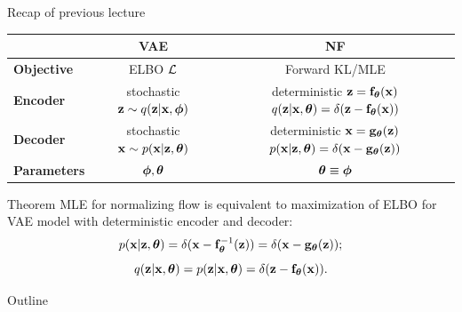 \begin{frame}{Recap of previous lecture}
	\begin{table}[]
		\begin{tabular}{l|c|c}
			& \textbf{VAE} & \textbf{NF} \\ \hline
			\textbf{Objective} & ELBO $\mathcal{L}$ & Forward KL/MLE \\ \hline
			\textbf{Encoder} & \shortstack{stochastic \\ $\mathbf{z} \sim q (\mathbf{z} | \mathbf{x}, \boldsymbol{\phi})$} &  \shortstack{\\ deterministic \\ $\mathbf{z} = \mathbf{f}_{\boldsymbol{\theta}}(\mathbf{x})$ \\ $q(\mathbf{z} | \mathbf{x}, \boldsymbol{\theta}) = \delta(\mathbf{z} - \mathbf{f}_{\boldsymbol{\theta}}(\mathbf{x}))$}  \\ \hline
			\textbf{Decoder} & \shortstack{stochastic \\ $\mathbf{x} \sim p (\mathbf{x} | \mathbf{z}, \boldsymbol{\theta})$} & \shortstack{\\ deterministic \\ $\mathbf{x} = \mathbf{g}_{\boldsymbol{\theta}}(\mathbf{z})$ \\ $ p(\mathbf{x} | \mathbf{z}, \boldsymbol{\theta}) = \delta(\mathbf{x} - \mathbf{g}_{\boldsymbol{\theta}}(\mathbf{z}))$} \\ \hline
			\textbf{Parameters}  & $\boldsymbol{\phi}, \boldsymbol{\theta}$ & $\boldsymbol{\theta} \equiv \boldsymbol{\phi}$\\ 
		\end{tabular}
	\end{table}
	\begin{block}{Theorem}
		MLE for normalizing flow is equivalent to maximization of ELBO for VAE model with deterministic encoder and decoder:
		\vspace{-0.3cm}
		\[
		p(\mathbf{x} | \mathbf{z}, \boldsymbol{\theta}) = \delta (\mathbf{x} - \mathbf{f}^{-1}_{\boldsymbol{\theta}}(\mathbf{z})) = \delta (\mathbf{x} - \mathbf{g}_{\boldsymbol{\theta}}(\mathbf{z}));
		\]
		\[
		q(\mathbf{z} | \mathbf{x}, \boldsymbol{\theta}) = p(\mathbf{z} | \mathbf{x}, \boldsymbol{\theta}) = \delta (\mathbf{z} - \mathbf{f}_{\boldsymbol{\theta}}(\mathbf{x})).
		\]
	\end{block}
\end{frame}
\begin{frame}{Outline}
	\tableofcontents
\end{frame}
